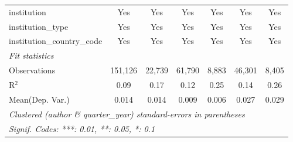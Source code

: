 \begin{tabular}{lcccccc}
   institution                  & Yes           & Yes          & Yes          & Yes     & Yes           & Yes\\  
   institution\_type            & Yes           & Yes          & Yes          & Yes     & Yes           & Yes\\  
   institution\_country\_code   & Yes           & Yes          & Yes          & Yes     & Yes           & Yes\\  
   \midrule
   \emph{Fit statistics}\\
   Observations                 & 151,126       & 22,739       & 61,790       & 8,883   & 46,301        & 8,405\\  
   R$^2$                        & 0.09          & 0.17         & 0.12         & 0.25    & 0.14          & 0.26\\  
Mean(Dep. Var.) & 0.014 & 0.014 & 0.009 & 0.006 & 0.027 & 0.029 \\
   \midrule \midrule
   \multicolumn{7}{l}{\emph{Clustered (author \& quarter\_year) standard-errors in parentheses}}\\
   \multicolumn{7}{l}{\emph{Signif. Codes: ***: 0.01, **: 0.05, *: 0.1}}\\
\end{tabular}
\par\endgroup
